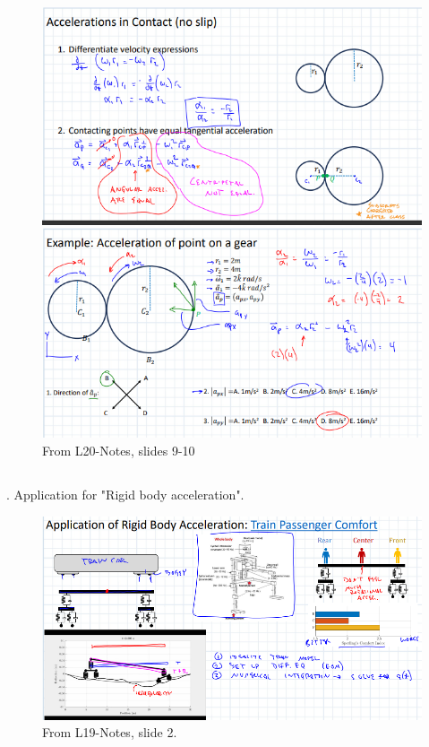     \begin{figure}[h!]
        \centering \includegraphics{RigidBodyKinematics/GearsAcceContact.png}
        \caption{From L20-Notes, slides 9-10}
        \label{fig:GearsAcceleration}
    \end{figure}
    
\subsection{}
    \subsubsection{}
    . Application for "Rigid body acceleration".

    \begin{figure}[h!]
        \centering
        \includegraphics{RigidBodyKinematics/AppTrainPassenger.png}
        \caption{From L19-Notes, slide 2.}
        \label{fig:AppTrainPassenger}
    \end{figure}

